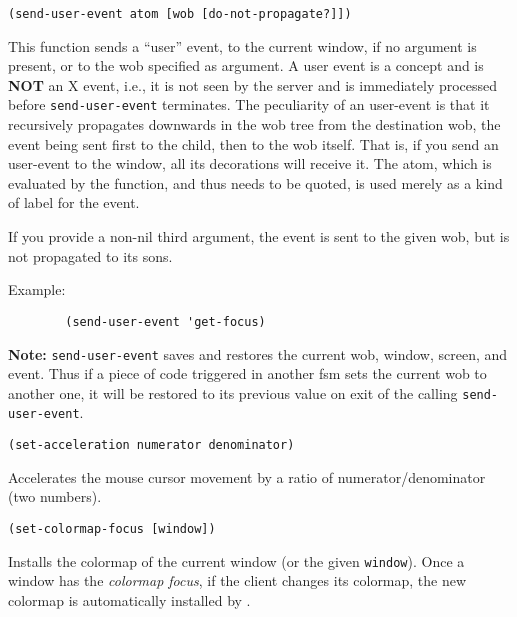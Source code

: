 {\usagefont\begin{verbatim}
(send-user-event atom [wob [do-not-propagate?]])
\end{verbatim}}\usageupspace

This function sends a ``user'' event, to the current window, if no argument
is present, or to the wob specified as argument. A user event is a {\GWM}
concept and is {\bf NOT} an X event, i.e., it is not seen by the server and is
immediately processed before \verb"send-user-event" terminates. The
peculiarity of an user-event is that it recursively propagates downwards in
the wob tree from the destination wob, the event being sent first to the
child, then to the wob itself. That is, if you send an user-event to the window, all
its decorations will receive it. The atom, which is evaluated by the
function, and thus needs to be quoted, is used merely as a kind of label for
the event.

If you provide a non-nil third argument, the event is sent to the given wob,
but is not propagated to its sons.

Example: 
{\exemplefont\upspace\begin{verbatim}
        (send-user-event 'get-focus)
\end{verbatim}}

{\bf Note:} \verb"send-user-event" saves and restores the current wob,
window, screen, and event. Thus if a piece of code triggered in another fsm sets the
current wob to another one, it will be restored to its previous value on
exit of the calling \verb"send-user-event".

        
{\usagefont\begin{verbatim}
(set-acceleration numerator denominator)
\end{verbatim}}\usageupspace

Accelerates the mouse cursor movement by a ratio of numerator/denominator
(two numbers).


{\usagefont\begin{verbatim}
(set-colormap-focus [window])
\end{verbatim}}\usageupspace

Installs the colormap of the current window (or the given \verb"window").
Once a window has the {\em colormap focus}, if the
client changes its colormap, the new colormap is automatically installed by
{\GWM}.

